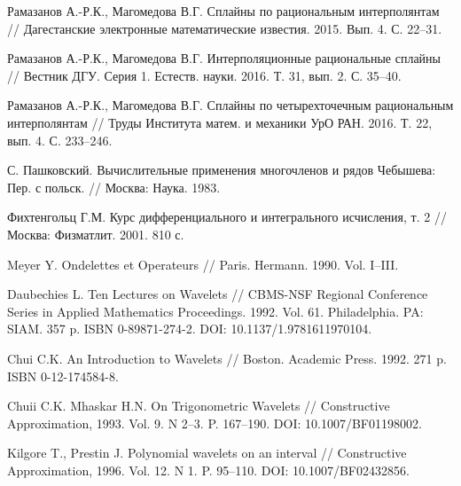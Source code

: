 \begin{thebibliography}{999}

Рамазанов А.-Р.К., Магомедова В.Г. Сплайны по рациональным интерполянтам // Дагестанские
электронные математические известия. 2015. Вып. 4. С. 22--31.




 Рамазанов А.-Р.К., Магомедова В.Г. Интерполяционные рациональные сплайны // Вестник ДГУ. Серия 1. Естеств. науки. 2016.
Т. 31, вып. 2. С. 35--40.




 Рамазанов А.-Р.К., Магомедова В.Г. Сплайны по четырехточечным рациональным интерполянтам // Труды Института матем. и механики УрО РАН. 2016. Т. 22, вып. 4. С. 233--246.




 С. Пашковский. Вычислительные применения многочленов и рядов Чебышева: Пер. с польск. // Москва: Наука. 1983.



 Фихтенгольц Г.М. Курс дифференциального и интегрального исчисления, т. 2 // Москва: Физматлит. 2001. 810 с.





 Meyer Y. Ondelettes et Operateurs // Paris. Hermann. 1990. Vol. I–III.




 Daubechies L. Ten Lectures on Wavelets // CBMS-NSF Regional Conference Series in Applied Mathematics Proceedings. 1992. Vol. 61. Philadelphia. PA: SIAM. 357 p. ISBN 0-89871-274-2. DOI: 10.1137/1.9781611970104.




 Chui C.K. An Introduction to  Wavelets // Boston. Academic Press. 1992. 271 p. ISBN 0-12-174584-8.




 Chuii C.K. Mhaskar H.N. On Trigonometric Wavelets // Constructive Approximation, 1993. Vol. 9. N 2--3. P. 167--190. DOI: 10.1007/BF01198002.




 Kilgore T., Prestin J. Polynomial wavelets on an interval // Constructive Approximation, 1996. Vol. 12. N 1. P. 95--110. DOI: 10.1007/BF02432856.




\end{thebibliography}

